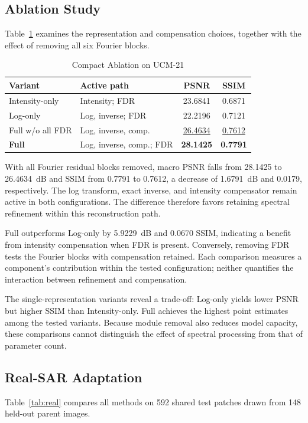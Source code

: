 \documentclass[conference]{IEEEtran}
\begin{document}
\subsection{Ablation Study}
Table~\ref{tab:ablation} examines the representation and compensation choices, together with the effect of removing all six Fourier blocks.
\begin{table}[!t]
\caption{Compact Ablation on UCM-21}
\label{tab:ablation}
\centering
\footnotesize
\setlength{\tabcolsep}{2.7pt}
\renewcommand{\arraystretch}{1.08}
\begin{tabularx}{\columnwidth}{@{}lXcc@{}}
\toprule
\textbf{Variant} & \textbf{Active path} & \textbf{PSNR} & \textbf{SSIM} \\
\midrule
Intensity-only & Intensity; FDR & 23.6841 & 0.6871 \\
Log-only & Log, inverse; FDR & 22.2196 & 0.7121 \\
Full w/o all FDR & Log, inverse, comp. & \underline{26.4634} & \underline{0.7612} \\
\textbf{Full} & Log, inverse, comp.; FDR & \textbf{28.1425} & \textbf{0.7791} \\
\bottomrule
\end{tabularx}
\end{table}
With all Fourier residual blocks removed, macro PSNR falls from 28.1425 to 26.4634~dB and SSIM from 0.7791 to 0.7612, a decrease of 1.6791~dB and 0.0179, respectively. The log transform, exact inverse, and intensity compensator remain active in both configurations. The difference therefore favors retaining spectral refinement within this reconstruction path.

Full outperforms Log-only by 5.9229~dB and 0.0670 SSIM, indicating a benefit from intensity compensation when FDR is present. Conversely, removing FDR tests the Fourier blocks with compensation retained. Each comparison measures a component's contribution within the tested configuration; neither quantifies the interaction between refinement and compensation.

The single-representation variants reveal a trade-off: Log-only yields lower PSNR but higher SSIM than Intensity-only. Full achieves the highest point estimates among the tested variants. Because module removal also reduces model capacity, these comparisons cannot distinguish the effect of spectral processing from that of parameter count.

\subsection{Real-SAR Adaptation}
Table~\ref{tab:real} compares all methods on 592 shared test patches drawn from 148 held-out parent images.
\end{document}
